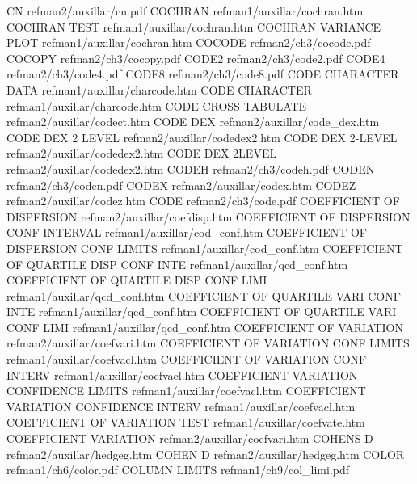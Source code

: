 CN                                      refman2/auxillar/cn.pdf
COCHRAN                                 refman1/auxillar/cochran.htm
COCHRAN TEST                            refman1/auxillar/cochran.htm
COCHRAN VARIANCE PLOT                   refman1/auxillar/cochran.htm
COCODE                                  refman2/ch3/cocode.pdf
COCOPY                                  refman2/ch3/cocopy.pdf
CODE2                                   refman2/ch3/code2.pdf
CODE4                                   refman2/ch3/code4.pdf
CODE8                                   refman2/ch3/code8.pdf
CODE CHARACTER DATA                     refman1/auxillar/charcode.htm
CODE CHARACTER                          refman1/auxillar/charcode.htm
CODE CROSS TABULATE                     refman2/auxillar/codect.htm
CODE DEX                                refman2/auxillar/code_dex.htm
CODE DEX 2 LEVEL                        refman2/auxillar/codedex2.htm
CODE DEX 2-LEVEL                        refman2/auxillar/codedex2.htm
CODE DEX 2LEVEL                         refman2/auxillar/codedex2.htm
CODEH                                   refman2/ch3/codeh.pdf
CODEN                                   refman2/ch3/coden.pdf
CODEX                                   refman2/auxillar/codex.htm
CODEZ                                   refman2/auxillar/codez.htm
CODE                                    refman2/ch3/code.pdf
COEFFICIENT OF DISPERSION               refman2/auxillar/coefdisp.htm
COEFFICIENT OF DISPERSION CONF INTERVAL refman1/auxillar/cod_conf.htm
COEFFICIENT OF DISPERSION CONF LIMITS   refman1/auxillar/cod_conf.htm
COEFFICIENT OF QUARTILE DISP CONF INTE  refman1/auxillar/qcd_conf.htm
COEFFICIENT OF QUARTILE DISP CONF LIMI  refman1/auxillar/qcd_conf.htm
COEFFICIENT OF QUARTILE VARI CONF INTE  refman1/auxillar/qcd_conf.htm
COEFFICIENT OF QUARTILE VARI CONF LIMI  refman1/auxillar/qcd_conf.htm
COEFFICIENT OF VARIATION                refman2/auxillar/coefvari.htm
COEFFICIENT OF VARIATION CONF LIMITS    refman1/auxillar/coefvacl.htm
COEFFICIENT OF VARIATION CONF INTERV    refman1/auxillar/coefvacl.htm
COEFFICIENT VARIATION CONFIDENCE LIMITS refman1/auxillar/coefvacl.htm
COEFFICIENT VARIATION CONFIDENCE INTERV refman1/auxillar/coefvacl.htm
COEFFICIENT OF VARIATION TEST           refman1/auxillar/coefvate.htm
COEFFICIENT VARIATION                   refman2/auxillar/coefvari.htm
COHENS D                                refman2/auxillar/hedgeg.htm
COHEN D                                 refman2/auxillar/hedgeg.htm
COLOR                                   refman1/ch6/color.pdf
COLUMN LIMITS                           refman1/ch9/col_limi.pdf
